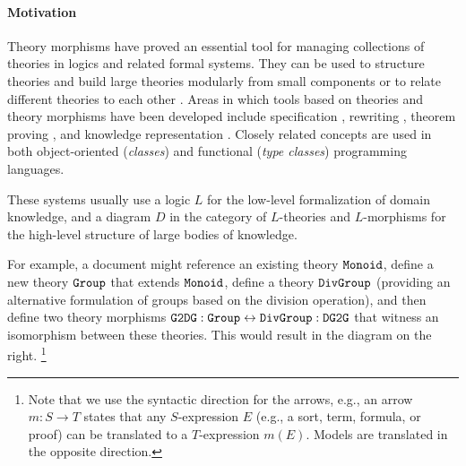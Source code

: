 \paragraph{Motivation}
Theory morphisms have proved an essential tool for managing collections of theories in logics and related formal systems.
They can be used to structure theories and build large theories modularly from small components or to relate different theories to each other \cite{asl,devgraphs,littletheories}.
Areas in which tools based on theories and theory morphisms have been developed include specification \cite{obj,hets}, rewriting \cite{maude}, theorem proving \cite{imps,isabelle_locales}, and knowledge representation \cite{RK:mmt:10}.
Closely related concepts are used in both object-oriented (\emph{classes}) and functional (\emph{type classes}) programming languages.


These systems usually use a logic $L$ for the low-level formalization of domain knowledge, and a diagram $D$ in the category of $L$-theories and $L$-morphisms for the high-level structure of large bodies of knowledge.

\begin{wrapfigure}{r}{5.5cm}
\vspace{-3em}
\vspace{-3.5em}
\end{wrapfigure}

For example, a document might reference an existing theory $\operatorname{\mathtt{Monoid}}$, define a new theory $\operatorname{\mathtt{Group}}$ that extends $\operatorname{\mathtt{Monoid}}$, define a theory $\operatorname{\mathtt{DivGroup}}$ (providing an alternative formulation of groups based on the division operation), and then define two theory morphisms $\operatorname{\mathtt{G2DG}}:\operatorname{\mathtt{Group}}\leftrightarrow \operatorname{\mathtt{DivGroup}}:\operatorname{\mathtt{DG2G}}$ that witness an isomorphism between these theories.
This would result in the diagram on the right.%
\footnote{Note that we use the syntactic direction for the arrows, e.g., an arrow $m:S\to T$ states that any $S$-expression $E$ (e.g., a sort, term, formula, or proof) can be translated to a $T$-expression $m(E)$. Models are translated in the opposite direction.}

